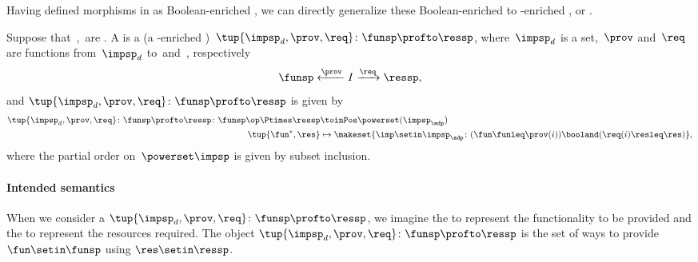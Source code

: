 Having defined morphisms in \DP as Boolean-enriched , we can directly generalize these Boolean-enriched  to \Set-enriched , or .
\begin{widepar}
    \begin{definition}
        \label{def:dpwithimp}
        Suppose that~\funsp,~\ressp are .
        A  is a  (a \Set-enriched )~$\tup{\impsp_d,\prov,\req}\colon \funsp\profto \ressp$, where~$\impsp_d$ is a set,~$\prov$ and~$\req$ are functions from~$\impsp_d$ to~\funsp and~\ressp, respectively
        \begin{equation}
            \funsp \xleftarrow{\prov} I \xrightarrow{\req} \ressp,
        \end{equation}
        and $\tup{\impsp_d,\prov,\req}\colon \funsp\profto \ressp$ is given by
        \begin{equation}
            \begin{aligned}
                \tup{\impsp_d,\prov,\req}\colon \funsp\profto \ressp \colon \funsp\op \Ptimes \ressp & \toinPos \powerset(\impsp_\adp) \\
                \tup{\fun^*, \res}                                                                   & \mapsto \makeset{ \imp \setin \impsp_\adp \colon ( \fun \funleq \prov(i)) \booland (\req(i) \resleq \res) },
            \end{aligned}
        \end{equation}
        where the partial order on~$\powerset\impsp$ is given by subset inclusion.
    \end{definition}
\end{widepar}

\paragraph{Intended semantics}
When we consider a  $\tup{\impsp_d, \prov, \req}\colon \funsp\profto \ressp$, we imagine the  \funsp to represent the functionality to be provided and the  \ressp to represent the resources required.
The object $\tup{\impsp_d,\prov,\req}\colon \funsp\profto \ressp$ is the set of ways to provide $\fun\setin \funsp$ using $\res\setin \ressp$.

